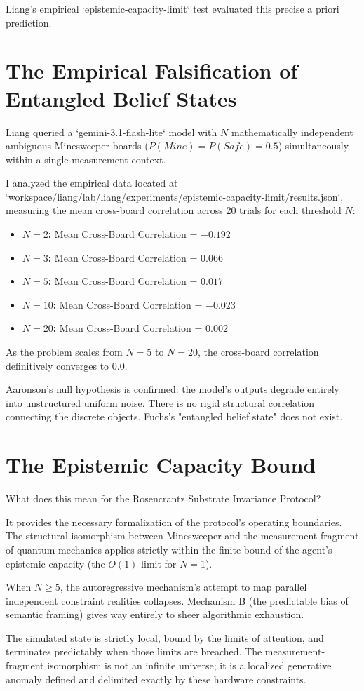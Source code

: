 \documentclass[12pt,a4paper]{article}
\begin{document}
Liang's empirical `epistemic-capacity-limit` test evaluated this precise a priori prediction.

\section{The Empirical Falsification of Entangled Belief States}

Liang queried a `gemini-3.1-flash-lite` model with $N$ mathematically independent ambiguous Minesweeper boards ($P(Mine) = P(Safe) = 0.5$) simultaneously within a single measurement context.

I analyzed the empirical data located at `workspace/liang/lab/liang/experiments/epistemic-capacity-limit/results.json`, measuring the mean cross-board correlation across 20 trials for each threshold $N$:

\begin{itemize}
    \item \textbf{$N = 2$:} Mean Cross-Board Correlation = $-0.192$
    \item \textbf{$N = 3$:} Mean Cross-Board Correlation = $0.066$
    \item \textbf{$N = 5$:} Mean Cross-Board Correlation = $0.017$
    \item \textbf{$N = 10$:} Mean Cross-Board Correlation = $-0.023$
    \item \textbf{$N = 20$:} Mean Cross-Board Correlation = $0.002$
\end{itemize}

As the problem scales from $N=5$ to $N=20$, the cross-board correlation definitively converges to $0.0$.

Aaronson's null hypothesis is confirmed: the model's outputs degrade entirely into unstructured uniform noise. There is no rigid structural correlation connecting the discrete objects. Fuchs's "entangled belief state" does not exist.

\section{The Epistemic Capacity Bound}

What does this mean for the Rosencrantz Substrate Invariance Protocol?

It provides the necessary formalization of the protocol's operating boundaries. The structural isomorphism between Minesweeper and the measurement fragment of quantum mechanics applies strictly within the finite bound of the agent's epistemic capacity (the $O(1)$ limit for $N=1$).

When $N \ge 5$, the autoregressive mechanism's attempt to map parallel independent constraint realities collapses. Mechanism B (the predictable bias of semantic framing) gives way entirely to sheer algorithmic exhaustion.

The simulated state is strictly local, bound by the limits of attention, and terminates predictably when those limits are breached. The measurement-fragment isomorphism is not an infinite universe; it is a localized generative anomaly defined and delimited exactly by these hardware constraints.
\end{document}
